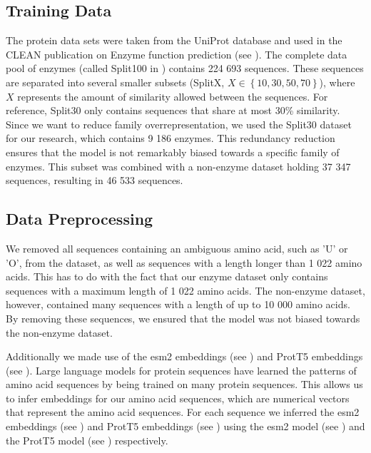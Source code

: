 \documentclass{bioinfo}
\begin{document}
\begin{methods}
\subsection{Training Data}

The protein data sets were taken from the UniProt database and used in the CLEAN publication on Enzyme function prediction (see \cite{CleanArticle}). 
The complete data pool of enzymes (called Split100 in \cite{CleanArticle}) contains 224 693 sequences. 
These sequences are separated into several smaller subsets (SplitX, $X \in \left\{10, 30, 50, 70\right\}$), where $X$ represents the amount of similarity allowed between the sequences.
For reference, Split30 only contains sequences that share at most 30\% similarity.
Since we want to reduce family overrepresentation, we used the Split30 dataset for our research,
which contains 9 186 enzymes.
This redundancy reduction ensures that the model is not remarkably biased towards a specific family of enzymes.
This subset was combined with a non-enzyme dataset holding 37 347 sequences, resulting in 46 533 sequences.

\subsection{Data Preprocessing}
We removed all sequences containing an ambiguous amino acid, such as 'U' or 'O', from the dataset, as well as
sequences with a length longer than 1 022 amino acids. 
This has to do with the fact that our enzyme dataset only contains sequences with a maximum length of 1 022 amino acids.
The non-enzyme dataset, however, contained many sequences with a length of up to 10 000 amino acids.
By removing these sequences, we ensured that the model was not biased towards the non-enzyme dataset.

Additionally we made use of the esm2 embeddings (see \cite{ESM2}) and ProtT5 embeddings (see \cite{ProtT5}).
Large language models for protein sequences have learned the patterns of amino acid sequences by being trained on many protein sequences.
This allows us to infer embeddings for our amino acid sequences, which are numerical vectors that represent the amino acid sequences.
For each sequence we inferred the esm2 embeddings (see \cite{ESM2}) and ProtT5 embeddings (see \cite{ProtT5}) 
using the esm2 model (see \cite{ESM2}) and the ProtT5 model (see \cite{ProtT5}) respectively.



\end{methods}
\end{document}
